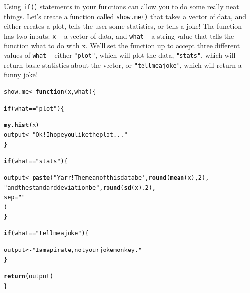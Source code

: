 \documentclass{tufte-book}\usepackage[]{graphicx}\usepackage[]{color}
\makeatletter
\newcommand{\hlnum}[1]{\textcolor[rgb]{0.686,0.059,0.569}{#1}}%
\newcommand{\hlstr}[1]{\textcolor[rgb]{0.192,0.494,0.8}{#1}}%
\newcommand{\hlopt}[1]{\textcolor[rgb]{0,0,0}{#1}}%
\newcommand{\hlstd}[1]{\textcolor[rgb]{0.345,0.345,0.345}{#1}}%
\newcommand{\hlkwa}[1]{\textcolor[rgb]{0.161,0.373,0.58}{\textbf{#1}}}%
\newcommand{\hlkwb}[1]{\textcolor[rgb]{0.69,0.353,0.396}{#1}}%
\newcommand{\hlkwc}[1]{\textcolor[rgb]{0.333,0.667,0.333}{#1}}%
\newcommand{\hlkwd}[1]{\textcolor[rgb]{0.737,0.353,0.396}{\textbf{#1}}}%
\newenvironment{kframe}{%
 \def\at@end@of@kframe{}%
 \ifinner\ifhmode%
  \def\at@end@of@kframe{\end{minipage}}%
  \begin{minipage}{\columnwidth}%
 \fi\fi%
 \def\FrameCommand##1{\hskip\@totalleftmargin \hskip-\fboxsep
 \colorbox{shadecolor}{##1}\hskip-\fboxsep
     \hskip-\linewidth \hskip-\@totalleftmargin \hskip\columnwidth}%
 \MakeFramed {\advance\hsize-\width
   \@totalleftmargin\z@ \linewidth\hsize
   \@setminipage}}%
 {\par\unskip\endMakeFramed%
 \at@end@of@kframe}
\newenvironment{knitrout}{}{} %
\makeatother
\begin{document}
Using \texttt{if()} statements in your functions can allow you to do some really neat things. Let's create a function called \texttt{show.me()} that takes a vector of data, and either creates a plot, tells the user some statistics, or tells a joke! The function has two inputs: \texttt{x} -- a vector of data, and \texttt{what} -- a string value that tells the function what to do with x. We'll set the function up to accept three different values of \texttt{what} -- either \texttt{"plot"}, which will plot the data, \texttt{"stats"}, which will return basic statistics about the vector, or \texttt{"tellmeajoke"}, which will return a funny joke!


\begin{knitrout}
\color{fgcolor}\begin{kframe}
\begin{alltt}
\hlstd{show.me} \hlkwb{<-} \hlkwa{function}\hlstd{(}\hlkwc{x}\hlstd{,} \hlkwc{what}\hlstd{) \{}

\hlkwa{if}\hlstd{(what} \hlopt{==} \hlstr{"plot"}\hlstd{) \{}

\hlkwd{my.hist}\hlstd{(x)}
\hlstd{output} \hlkwb{<-} \hlstr{"Ok! I hope you like the plot..."}
\hlstd{\}}

\hlkwa{if}\hlstd{(what} \hlopt{==} \hlstr{"stats"}\hlstd{) \{}

\hlstd{output} \hlkwb{<-} \hlkwd{paste}\hlstd{(}\hlstr{"Yarr! The mean of this data be "}\hlstd{,} \hlkwd{round}\hlstd{(}\hlkwd{mean}\hlstd{(x),} \hlnum{2}\hlstd{),}
            \hlstr{" and the standard deviation be "}\hlstd{,} \hlkwd{round}\hlstd{(}\hlkwd{sd}\hlstd{(x),} \hlnum{2}\hlstd{),}
            \hlkwc{sep} \hlstd{=} \hlstr{""}
            \hlstd{)}
\hlstd{\}}

\hlkwa{if}\hlstd{(what} \hlopt{==} \hlstr{"tellmeajoke"}\hlstd{) \{}

\hlstd{output} \hlkwb{<-} \hlstr{"I am a pirate, not your joke monkey."}
\hlstd{\}}

\hlkwd{return}\hlstd{(output)}
\hlstd{\}}
\end{alltt}
\end{kframe}
\end{knitrout}
\end{document}
